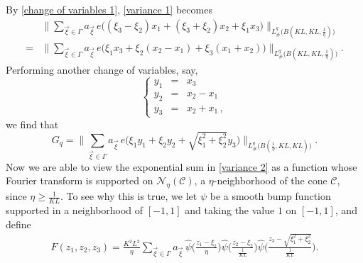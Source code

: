 \documentclass[11pt]{amsart}
\numberwithin{equation}{section}
\theoremstyle{definition}
\theoremstyle{proposition}
\begin{document}
By \eqref{change of variables 1}, \eqref{variance 1} becomes 
\[
\begin{split}
&\Big \|\sum_{\Vec{\xi}\in \Gamma}a_{\Vec{\xi}}\, e\Big((\xi_3-\xi_2)x_1+(\xi_3+\xi_2)x_2+\xi_1x_3\Big)\Big\|_{L^q_{\#}\Big(B(KL,KL,\frac{1}{\eta})\Big)}    
\\ =& \Big\|\sum_{\Vec{\xi}\in \Gamma}a_{\Vec{\xi}} \,e\Big(\xi_1 x_3 +\xi_2(x_2-x_1)+\xi_3(x_1+x_2)\Big)\Big\|_{L^q_{\#}\Big(B(KL,KL,\frac{1}{\eta})\Big)}.
\end{split}
\]
Performing another change of variables, say, 
\begin{equation}    \label{change of variables 2}
\left\{\begin{array}{rcl}
y_1 &=& x_3
\\ y_2 &= & x_2-x_1
\\ y_3 &=&  x_2+x_1\,,
\end{array}    \right.
\end{equation} 
we find that 
\begin{equation} \label{variance 2} G_q =\Big\|\sum_{\Vec{\xi}\in \Gamma}a_{\Vec{\xi}}\,e\Big(\xi_1 y_1+\xi_2 y_2+\sqrt{\xi_1^2+\xi_2^2}y_3\Big)\Big\|_{L^q_{\#}\Big( B(\frac{1}{\eta},KL,KL) \Big)}. 
\end{equation}
Now we are able to view the exponential sum in \eqref{variance 2} as a function whose Fourier transform is supported on $\mathcal N_\eta(\mathcal C)$, a $\eta$-neighborhood of the cone $\mathcal C$, since $\eta\ge \frac{1}{KL}$.  To see why this is true, we let $\psi$ be a smooth bump function supported in a neighborhood of $[-1,1]$ and taking the value $1$ on $[-1,1]$, and define
\[
\begin{split}
F(z_1,z_2,z_3)  = \frac{K^2L^2}{\eta} \sum_{\Vec{\xi}\in \Gamma}  a_{\Vec{\xi}} \,  \widehat{\psi}\Big(\frac{z_1-\xi_1}{\eta}\Big) \widehat{\psi}\Big(\frac{z_2-\xi_2}{\frac{1}{KL}} \Big)  \widehat{\psi}\Big(\frac{z_3-\sqrt{\xi_1^2+\xi_2^2}}{\frac{1}{KL}}\Big).  
\end{split}
\]
\end{document}
